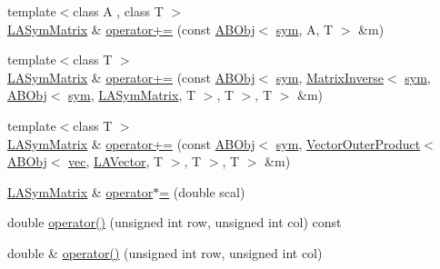 \begin{DoxyCompactItemize}
\item 
{\footnotesize template$<$class A , class T $>$ }\\\mbox{\hyperlink{classROOT_1_1Minuit2_1_1LASymMatrix}{L\+A\+Sym\+Matrix}} \& \mbox{\hyperlink{classROOT_1_1Minuit2_1_1LASymMatrix_a748a3aba1dc95fa7759e0383e85b9374}{operator+=}} (const \mbox{\hyperlink{classROOT_1_1Minuit2_1_1ABObj}{A\+B\+Obj}}$<$ \mbox{\hyperlink{classROOT_1_1Minuit2_1_1sym}{sym}}, A, T $>$ \&m)
\item 
{\footnotesize template$<$class T $>$ }\\\mbox{\hyperlink{classROOT_1_1Minuit2_1_1LASymMatrix}{L\+A\+Sym\+Matrix}} \& \mbox{\hyperlink{classROOT_1_1Minuit2_1_1LASymMatrix_a57fe61819895d7ff65c48767eb5b282e}{operator+=}} (const \mbox{\hyperlink{classROOT_1_1Minuit2_1_1ABObj}{A\+B\+Obj}}$<$ \mbox{\hyperlink{classROOT_1_1Minuit2_1_1sym}{sym}}, \mbox{\hyperlink{classROOT_1_1Minuit2_1_1MatrixInverse}{Matrix\+Inverse}}$<$ \mbox{\hyperlink{classROOT_1_1Minuit2_1_1sym}{sym}}, \mbox{\hyperlink{classROOT_1_1Minuit2_1_1ABObj}{A\+B\+Obj}}$<$ \mbox{\hyperlink{classROOT_1_1Minuit2_1_1sym}{sym}}, \mbox{\hyperlink{classROOT_1_1Minuit2_1_1LASymMatrix}{L\+A\+Sym\+Matrix}}, T $>$, T $>$, T $>$ \&m)
\item 
{\footnotesize template$<$class T $>$ }\\\mbox{\hyperlink{classROOT_1_1Minuit2_1_1LASymMatrix}{L\+A\+Sym\+Matrix}} \& \mbox{\hyperlink{classROOT_1_1Minuit2_1_1LASymMatrix_a2d453653e316685b846ddeb299708f3d}{operator+=}} (const \mbox{\hyperlink{classROOT_1_1Minuit2_1_1ABObj}{A\+B\+Obj}}$<$ \mbox{\hyperlink{classROOT_1_1Minuit2_1_1sym}{sym}}, \mbox{\hyperlink{classROOT_1_1Minuit2_1_1VectorOuterProduct}{Vector\+Outer\+Product}}$<$ \mbox{\hyperlink{classROOT_1_1Minuit2_1_1ABObj}{A\+B\+Obj}}$<$ \mbox{\hyperlink{classROOT_1_1Minuit2_1_1vec}{vec}}, \mbox{\hyperlink{classROOT_1_1Minuit2_1_1LAVector}{L\+A\+Vector}}, T $>$, T $>$, T $>$ \&m)
\item 
\mbox{\hyperlink{classROOT_1_1Minuit2_1_1LASymMatrix}{L\+A\+Sym\+Matrix}} \& \mbox{\hyperlink{classROOT_1_1Minuit2_1_1LASymMatrix_abb10e4e092df8072bf59de3a0880b336}{operator$\ast$=}} (double scal)
\item 
double \mbox{\hyperlink{classROOT_1_1Minuit2_1_1LASymMatrix_a3a1a954a9e1ab78f255146ccd76d3847}{operator()}} (unsigned int row, unsigned int col) const
\item 
double \& \mbox{\hyperlink{classROOT_1_1Minuit2_1_1LASymMatrix_a580d204fdc526218483e7b2e276da265}{operator()}} (unsigned int row, unsigned int col)
\item 

\end{DoxyCompactItemize}
